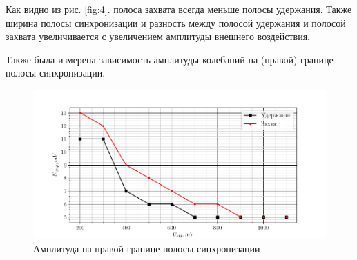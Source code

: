 Как видно из рис. \ref{fig:4}. полоса захвата всегда меньше полосы удержания. Также ширина полосы синхронизации и
разность между полосой удержания и полосой захвата увеличивается с увеличением амплитуды внешнего воздействия.

Также была измерена зависимость амплитуды колебаний на (правой) границе полосы синхронизации.

\begin{figure}[H]
	\centering
	\includegraphics[width = .85\linewidth]{graphs/amps1.png}
	\caption{Амплитуда на правой границе полосы синхронизации}
	\label{fig:5}
\end{figure}

